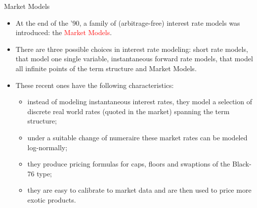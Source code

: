 \documentclass{beamer}
\begin{document}
\begin{frame}{Market Models}
	\begin{itemize}
		\item At the end of the ’90, a family of (arbitrage-free) interest rate models was introduced: the \textcolor{red}{Market Models}. %
		\item There are three possible choices in interest rate modeling: short rate models, that model one single variable, instantaneous forward rate models, that model all infinite points of the term structure and Market Models.
		\item These recent ones have the following characteristics:
		\begin{itemize}
			\item instead of modeling instantaneous interest rates, they model a selection of discrete real world rates (quoted in the market) spanning the term structure;
			\item under a suitable change of numeraire these market rates can be modeled log-normally;
			\item they produce pricing formulas for caps, floors and swaptions of the Black-76 type;
			\item they are easy to calibrate to market data and are then used to price more exotic products.
		\end{itemize}
	\end{itemize}
\end{frame}
\end{document}
